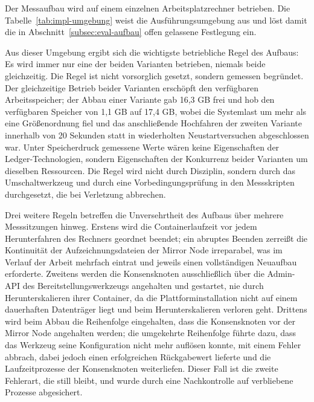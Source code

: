 Der Messaufbau wird auf einem einzelnen Arbeitsplatzrechner betrieben. Die Tabelle~\ref{tab:impl-umgebung} weist die Ausführungsumgebung aus und löst damit die in Abschnitt~\ref{subsec:eval-aufbau} offen gelassene Festlegung ein.

Aus dieser Umgebung ergibt sich die wichtigste betriebliche Regel des Aufbaus: Es wird immer nur eine der beiden Varianten betrieben, niemals beide gleichzeitig. Die Regel ist nicht vorsorglich gesetzt, sondern gemessen begründet. Der gleichzeitige Betrieb beider Varianten erschöpft den verfügbaren Arbeitsspeicher; der Abbau einer Variante gab 16,3 GB frei und hob den verfügbaren Speicher von 1,1 GB auf 17,4 GB, wobei die Systemlast um mehr als eine Größenordnung fiel und das anschließende Hochfahren der zweiten Variante innerhalb von 20 Sekunden statt in wiederholten Neustartversuchen abgeschlossen war. Unter Speicherdruck gemessene Werte wären keine Eigenschaften der Ledger-Technologien, sondern Eigenschaften der Konkurrenz beider Varianten um dieselben Ressourcen. Die Regel wird nicht durch Disziplin, sondern durch das Umschaltwerkzeug und durch eine Vorbedingungsprüfung in den Messskripten durchgesetzt, die bei Verletzung abbrechen.

Drei weitere Regeln betreffen die Unversehrtheit des Aufbaus über mehrere Messsitzungen hinweg. Erstens wird die Containerlaufzeit vor jedem Herunterfahren des Rechners geordnet beendet; ein abruptes Beenden zerreißt die Kontinuität der Aufzeichnungsdateien der Mirror Node irreparabel, was im Verlauf der Arbeit mehrfach eintrat und jeweils einen vollständigen Neuaufbau erforderte. Zweitens werden die Konsensknoten ausschließlich über die Admin-API des Bereitstellungswerkzeugs angehalten und gestartet, nie durch Herunterskalieren ihrer Container, da die Plattforminstallation nicht auf einem dauerhaften Datenträger liegt und beim Herunterskalieren verloren geht. Drittens wird beim Abbau die Reihenfolge eingehalten, dass die Konsensknoten vor der Mirror Node angehalten werden; die umgekehrte Reihenfolge führte dazu, dass das Werkzeug seine Konfiguration nicht mehr auflösen konnte, mit einem Fehler abbrach, dabei jedoch einen erfolgreichen Rückgabewert lieferte und die Laufzeitprozesse der Konsensknoten weiterliefen. Dieser Fall ist die zweite Fehlerart, die still bleibt, und wurde durch eine Nachkontrolle auf verbliebene Prozesse abgesichert.

